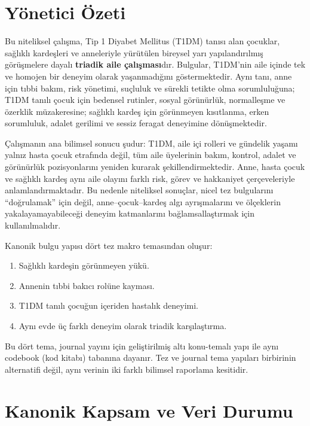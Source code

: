 \documentclass[
  turkish,
  a4paper,
  DIV=11,
  numbers=noendperiod]{scrreprt}
\providecommand{\tightlist}{%
  \setlength{\itemsep}{0pt}\setlength{\parskip}{0pt}}
\begin{document}
\chapter{Yönetici Özeti}\label{sec-ozet}

Bu niteliksel çalışma, Tip 1 Diyabet Mellitus (T1DM) tanısı alan
çocuklar, sağlıklı kardeşleri ve anneleriyle yürütülen bireysel yarı
yapılandırılmış görüşmelere dayalı \textbf{triadik aile çalışması}dır.
Bulgular, T1DM'nin aile içinde tek ve homojen bir deneyim olarak
yaşanmadığını göstermektedir. Aynı tanı, anne için tıbbi bakım, risk
yönetimi, suçluluk ve sürekli tetikte olma sorumluluğuna; T1DM tanılı
çocuk için bedensel rutinler, sosyal görünürlük, normalleşme ve özerklik
müzakeresine; sağlıklı kardeş için görünmeyen kısıtlanma, erken
sorumluluk, adalet gerilimi ve sessiz feragat deneyimine dönüşmektedir.

Çalışmanın ana bilimsel sonucu şudur: T1DM, aile içi rolleri ve gündelik
yaşamı yalnız hasta çocuk etrafında değil, tüm aile üyelerinin bakım,
kontrol, adalet ve görünürlük pozisyonlarını yeniden kurarak
şekillendirmektedir. Anne, hasta çocuk ve sağlıklı kardeş aynı aile
olayını farklı risk, görev ve hakkaniyet çerçeveleriyle
anlamlandırmaktadır. Bu nedenle niteliksel sonuçlar, nicel tez
bulgularını ``doğrulamak'' için değil, anne--çocuk--kardeş algı
ayrışmalarını ve ölçeklerin yakalayamayabileceği deneyim katmanlarını
bağlamsallaştırmak için kullanılmalıdır.

Kanonik bulgu yapısı dört tez makro temasından oluşur:

\begin{enumerate}
\def\labelenumi{\arabic{enumi}.}
\tightlist
\item
  Sağlıklı kardeşin görünmeyen yükü.
\item
  Annenin tıbbi bakıcı rolüne kayması.
\item
  T1DM tanılı çocuğun içeriden hastalık deneyimi.
\item
  Aynı evde üç farklı deneyim olarak triadik karşılaştırma.
\end{enumerate}

Bu dört tema, journal yayını için geliştirilmiş altı konu-temalı yapı
ile aynı codebook (kod kitabı) tabanına dayanır. Tez ve journal tema
yapıları birbirinin alternatifi değil, aynı verinin iki farklı bilimsel
raporlama kesitidir.

\chapter{Kanonik Kapsam ve Veri Durumu}\label{sec-kapsam}
\end{document}
